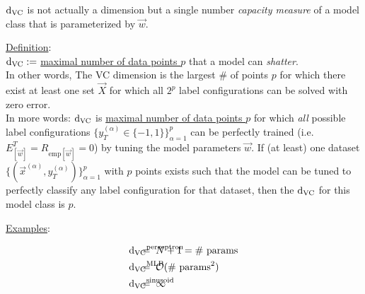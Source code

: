 \begin{frame}\frametitle{\secname}

$\mathrm{d}_{\mathrm{VC}}$ is not actually a dimension but a single number \emph{capacity measure} 
of a model class that is parameterized by $\vec w$.

\underline{Definition}:\\

$\mathrm{d}_{\mathrm{VC}} :=$ \underline{maximal number of data points $p$} that a model can \emph{shatter}.\\

In other words, The VC dimension is the largest \# of points  
$p$ for which there exist at least one set  
$\vec X$ for which all  
$2^p$ label configurations can be solved with zero error.\\

In more words: $\mathrm{d}_{\mathrm{VC}}$ is \underline{maximal number of data points $p$} for which \emph{all} possible label configurations $\{y_{T}^{(\alpha)} \in \{-1,1\}\}_{\alpha=1}^{p}$ can be perfectly trained (i.e. $E^{T}_{[\vec w]} = R_{\text{emp}[\vec w]} = 0$) by tuning the model parameters $\vec w$.
If (at least) one dataset $\{(\vec x^{(\alpha)}, y_{T}^{(\alpha)})\}_{\alpha=1}^{p}$ with $p$ points exists such that the model can be tuned to perfectly classify any label configuration for that dataset, then the $\mathrm{d}_{\mathrm{VC}}$ for this model class is $p$.



\end{frame}

\begin{frame}

\underline{Examples}:

\begin{align}
&{\dvc}^{\text{perceptron}} &\kern-12ex=\;\;& N+1 = \text{\# params}\\
&{\dvc}^{\text{MLP}} &\kern-12ex=\;\;& \mathcal{O}(\text{\# params}^{2})\\
&{\dvc}^{\text{sinusoid}} &\kern-12ex=\;\;& \infty
\end{align}
    
\end{frame}

